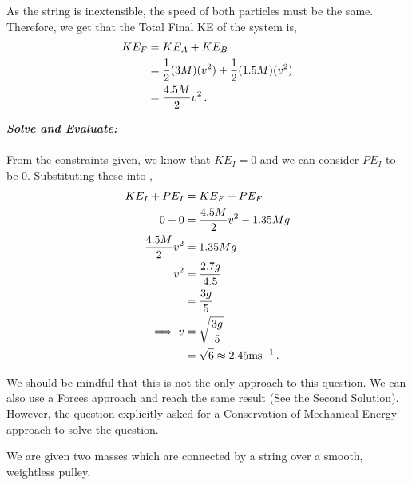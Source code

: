 \begin{subquestions}
As the string is inextensible, the speed of both particles must be the same. Therefore, we get that the Total Final KE of the system is,
\begin{align}
	KE_F & = KE_A + KE_B \nonumber \\
	     & = \frac{1}{2}(3M)(v^2) + \frac{1}{2}(1.5M)(v^2) \nonumber \\
	     & = \frac{4.5M}{2}v^2 \,.
\end{align}




\textbf{\textit{Solve and Evaluate:}} \\ \\
From the constraints given, we know that $KE_I=0$ and we can consider $PE_I$ to be 0. Substituting these into , 
\begin{align}
	KE_I + PE_I & = KE_F + PE_F \nonumber \\
	0 + 0 & = \frac{4.5M}{2}v^2 - 1.35Mg \nonumber \\
	\frac{4.5M}{2}v^2 & = 1.35Mg \nonumber \\
	v^2 & = \frac{2.7g}{4.5} \nonumber \\
	    & = \frac{3g}{5} \nonumber \\
	    \implies v & = \sqrt{\frac{3g}{5}} \nonumber \\
	               & = \sqrt{6} \approx 2.45 \text{ms}^{-1} \,.
\end{align}

We should be mindful that this is not the only approach to this question. We can also use a Forces approach and reach the same result (See the Second Solution). However, the question explicitly asked for a Conservation of Mechanical Energy approach to solve the question.
	

\subquestion
We are given two masses which are connected by a string over a smooth, weightless pulley.


\end{subquestions}
